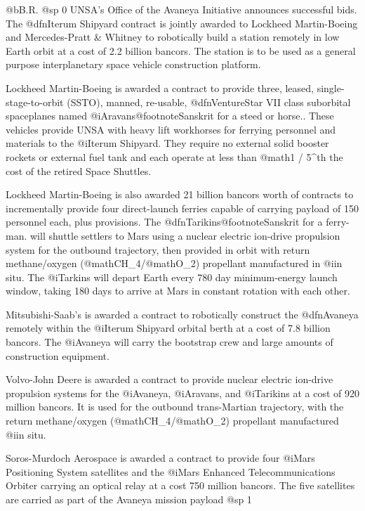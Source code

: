 @b{B.R.}
@sp 0
UNSA's Office of the Avaneya Initiative announces successful bids. The @dfn{Iterum Shipyard} contract is jointly awarded to Lockheed Martin-Boeing and Mercedes-Pratt & Whitney to robotically build a station remotely in low Earth orbit at a cost of 2.2 billion bancors. The station is to be used as a general purpose interplanetary space vehicle construction platform.

Lockheed Martin-Boeing is awarded a contract to provide three, leased, single-stage-to-orbit (SSTO), manned, re-usable, @dfn{VentureStar VII} class suborbital spaceplanes named @i{Aravans}@footnote{Sanskrit for a steed or horse.}. These vehicles provide UNSA with heavy lift workhorses for ferrying personnel and materials to the @i{Iterum Shipyard}. They require no external solid booster rockets or external fuel tank and each operate at less than @math{{1 / 5}^{th} } the cost of the retired Space Shuttles.

Lockheed Martin-Boeing is also awarded 21 billion bancors worth of contracts to incrementally provide four direct-launch ferries capable of carrying payload of 150 personnel each, plus provisions. The @dfn{Tarikins}@footnote{Sanskrit for a ferry-man.} will shuttle settlers to Mars using a nuclear electric ion-drive propulsion system for the outbound trajectory, then provided in orbit with return methane/oxygen (@math{CH_4}/@math{O_2}) propellant manufactured in @i{in situ}. The @i{Tarkins} will depart Earth every 780 day minimum-energy launch window, taking 180 days to arrive at Mars in constant rotation with each other.

Mitsubishi-Saab's is awarded a contract to robotically construct the @dfn{Avaneya} remotely within the @i{Iterum Shipyard} orbital berth at a cost of 7.8 billion bancors. The @i{Avaneya} will carry the bootstrap crew and large amounts of construction equipment.

Volvo-John Deere is awarded a contract to provide nuclear electric ion-drive propulsion systems for the @i{Avaneya}, @i{Aravans}, and @i{Tarikins} at a cost of 920 million bancors. It is used for the outbound trans-Martian trajectory, with the return methane/oxygen (@math{CH_4}/@math{O_2}) propellant manufactured @i{in situ}.

Soros-Murdoch Aerospace is awarded a contract to provide four @i{Mars Positioning System} satellites and the @i{Mars Enhanced Telecommunications Orbiter} carrying an optical relay at a cost 750 million bancors. The five satellites are carried as part of the Avaneya mission payload
@sp 1

